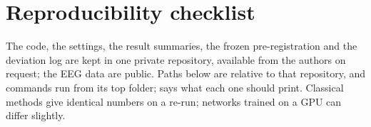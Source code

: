 \section*{Reproducibility checklist}

The code, the settings, the result summaries, the frozen pre-registration and the deviation
log are kept in one private repository, available from the authors on request; the EEG data
are public. Paths below are relative to that repository, and commands run from its top
folder;  says what each one should print. Classical methods give
identical numbers on a re-run; networks trained on a GPU can differ slightly.

